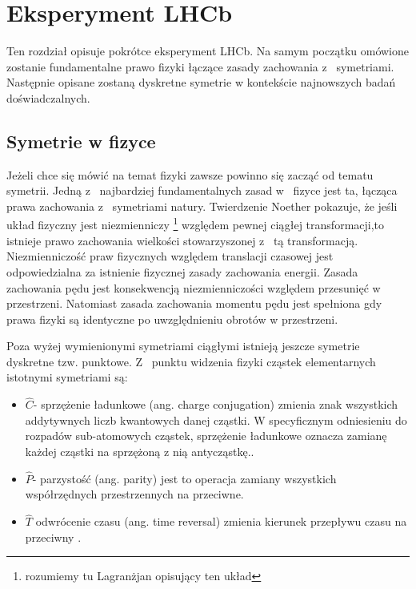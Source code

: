 \chapter{Eksperyment LHCb}

Ten rozdział opisuje pokrótce eksperyment LHCb. Na samym początku omówione zostanie fundamentalne prawo fizyki łączące zasady zachowania z~ symetriami. Następnie opisane zostaną dyskretne symetrie w kontekście najnowszych badań doświadczalnych.   

\section{Symetrie w fizyce}
Jeżeli chce się mówić na temat fizyki zawsze powinno się zacząć od tematu symetrii. Jedną z~ najbardziej fundamentalnych zasad w~ fizyce jest ta, łącząca prawa zachowania z~ symetriami natury. Twierdzenie Noether \cite{Noether} pokazuje, że jeśli układ fizyczny jest niezmienniczy \footnote{rozumiemy tu Lagranżjan opisujący ten układ} względem pewnej ciągłej transformacji,to istnieje prawo zachowania wielkości stowarzyszonej z~ tą transformacją. Niezmienniczość praw fizycznych względem translacji czasowej jest odpowiedzialna za istnienie fizycznej zasady zachowania energii. Zasada zachowania pędu jest konsekwencją niezmienniczości względem przesunięć w przestrzeni. Natomiast zasada zachowania momentu pędu jest spełniona gdy prawa fizyki są identyczne po uwzględnieniu obrotów w przestrzeni. 

Poza wyżej wymienionymi symetriami ciągłymi istnieją jeszcze symetrie dyskretne tzw. punktowe. Z~ punktu widzenia fizyki cząstek elementarnych istotnymi symetriami są:

\begin{itemize}
\item \textbf{$\hat{C}$}- sprzężenie ładunkowe (ang. charge conjugation) zmienia znak wszystkich addytywnych liczb kwantowych danej cząstki. W specyficznym odniesieniu do rozpadów sub-atomowych cząstek, sprzężenie ładunkowe oznacza zamianę każdej cząstki na sprzężoną z nią antycząstkę.\cite{symmetry}.
\item \textbf{$\hat{P}$}- parzystość (ang. parity) jest to operacja zamiany wszystkich współrzędnych przestrzennych na przeciwne. \cite{symmetry}
\item \textbf{$\hat{T}$} odwrócenie czasu (ang. time reversal) zmienia kierunek przepływu czasu na przeciwny \cite{symmetry}.
\end{itemize}

